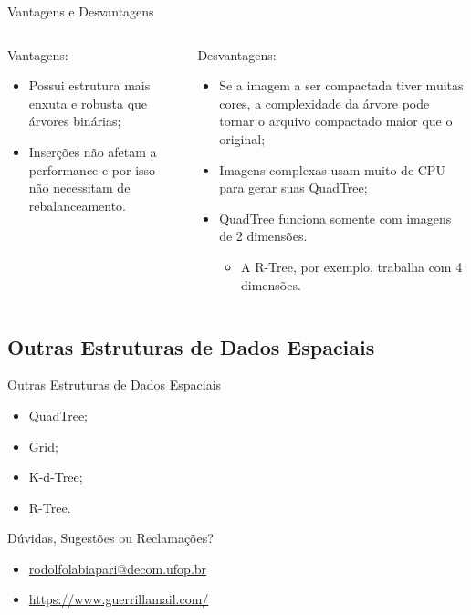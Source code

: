 \documentclass[red, tikz, aspectratio=169, xcolor=dvipsnames]{beamer}
\let\olditem=\item%
\renewcommand{\item}{\olditem \justifying}
\begin{document}
		\begin{frame}{Vantagens e Desvantagens}
			\begin{columns}
				\begin{column}{0.48\textwidth}
					Vantagens:
					\begin{itemize}
						\item Possui estrutura mais enxuta e robusta que árvores binárias;
						
						\item Inserções não afetam a performance e por isso não necessitam de rebalanceamento.
					\end{itemize}
				\end{column}
				\begin{column}{0.5\textwidth}
					Desvantagens:
					\begin{itemize}
						\setlength{\itemsep}{1em}
						\item Se a imagem a ser compactada tiver muitas cores, a complexidade da árvore pode tornar o arquivo compactado maior que o original;
						
						\item Imagens complexas usam muito de CPU para gerar suas QuadTree;
						
						\item QuadTree funciona somente com imagens de 2 dimensões.
						\begin{itemize}
							\item A R-Tree, por exemplo, trabalha com 4 dimensões.
						\end{itemize}
					\end{itemize}
				\end{column}
			\end{columns}
		\end{frame}

	
	\subsection{Outras Estruturas de Dados Espaciais}
		\begin{frame}{Outras Estruturas de Dados Espaciais}
			\begin{itemize}
				\setlength{\itemsep}{1.2em}
				\item QuadTree;
				\item Grid;
				\item K-d-Tree;
				\item R-Tree.
			\end{itemize}
		\end{frame}

		\begin{frame}{Dúvidas, Sugestões ou Reclamações?}
			\begin{itemize}
				\item \url{rodolfolabiapari@decom.ufop.br} \\[1cm]
				\item \url{https://www.guerrillamail.com/}
			\end{itemize}
		\end{frame}

\frame{\titlepage}
\end{document}
